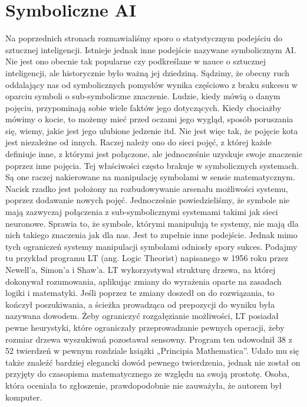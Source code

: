 \chapter{Symboliczne AI}
\label{chap:symbolic:ai}

Na poprzednich stronach rozmawialiśmy sporo o statystycznym podejściu do sztucznej inteligencji. Istnieje jednak inne podejście nazywane symbolicznym AI. Nie jest ono obecnie tak popularne czy podkreślane w nauce o sztucznej inteligencji, ale historycznie było ważną jej dziedziną. Sądzimy, że obecny ruch oddalający nas od symbolicznych pomysłów wynika częściowo z braku sukcesu w oparciu symboli o sub-symboliczne znaczenie. Ludzie, kiedy mówią o danym pojęciu, przypominają sobie wiele faktów jego dotyczących. Kiedy chociażby mówimy o kocie, to możemy mieć przed oczami jego wygląd, sposób poruszania się, wiemy, jakie jest jego ulubione jedzenie itd. Nie jest więc tak, że pojęcie kota jest niezależne od innych. Raczej należy ono do sieci pojęć, z której każde definiuje inne, z którymi jest połączone, ale jednocześnie uzyskuje swoje znaczenie poprzez inne pojęcia. Tej właściwości często brakuje w symbolicznych systemach. Są one raczej nakierowane na manipulację symbolami w sensie matematycznym. Nacisk rzadko jest położony na rozbudowywanie arsenału możliwości systemu, poprzez dodawanie nowych pojęć. Jednocześnie powiedzieliśmy, że symbole nie mają zazwyczaj połączenia z sub-symbolicznymi systemami takimi jak sieci neuronowe. Sprawia to, że symbole, którymi manipulują te systemy, nie mają dla nich takiego znaczenia jak dla nas. Jest to zupełnie inne podejście. Jednak mimo tych ograniczeń systemy manipulacji symbolami odniosły spory sukces. Podajmy tu przykład programu LT (ang. Logic Theorist) napisanego w 1956 roku przez Newell’a, Simon’a i Shaw’a. LT wykorzystywał strukturę drzewa, na której dokonywał rozumowania, aplikując zmiany do wyrażenia oparte na zasadach logiki i matematyki. Jeśli poprzez te zmiany doszedł on do rozwiązania, to kończył poszukiwania, a ścieżka prowadząca od prepozycji do wyniku była nazywana dowodem. Żeby ograniczyć rozgałęzianie możliwości, LT posiadał pewne heurystyki, które ograniczały przeprowadzanie pewnych operacji, żeby rozmiar drzewa wyszukiwań pozostawał sensowny. Program ten udowodnił 38 z 52 twierdzeń w pewnym rozdziale książki „Principia Mathematica”. Udało mu się także znaleźć bardziej elegancki dowód pewnego twierdzenia, jednak nie został on przyjęty do czasopisma matematycznego ze względu na swoją prostotę. Osoba, która oceniała to zgłoszenie, prawdopodobnie nie zauważyła, że autorem był komputer.\newline

